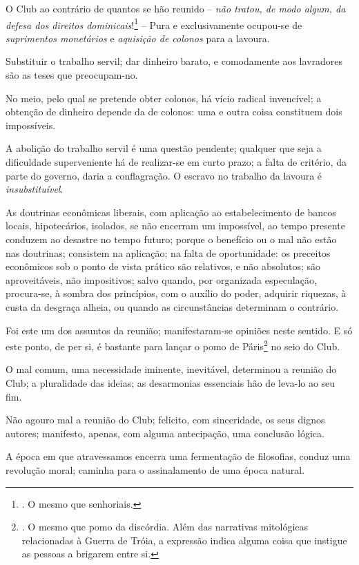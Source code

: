 O Club ao contrário de quantos se hão reunido -- \emph{não tratou, de
modo algum, da defesa dos direitos dominicais}!\footnote{. O mesmo que
  senhoriais.} -- Pura e exclusivamente ocupou-se de \emph{suprimentos
monetários} e \emph{aquisição de colonos} para a lavoura.

Substituir o trabalho servil; dar dinheiro barato, e comodamente aos
lavradores são as teses que preocupam-no.

No meio, pelo qual se pretende obter colonos, há vício radical
invencível; a obtenção de dinheiro depende da de colonos: uma e outra
coisa constituem dois impossíveis.

A abolição do trabalho servil é uma questão pendente; qualquer que seja
a dificuldade superveniente há de realizar-se em curto prazo; a falta de
critério, da parte do governo, daria a conflagração. O escravo no
trabalho da lavoura é \emph{insubstituível}.

As doutrinas econômicas liberais, com aplicação ao estabelecimento de
bancos locais, hipotecários, isolados, se não encerram um impossível, ao
tempo presente conduzem ao desastre no tempo futuro; porque o benefício
ou o mal não estão nas doutrinas; consistem na aplicação; na falta de
oportunidade: os preceitos econômicos sob o ponto de vista prático são
relativos, e não absolutos; são aproveitáveis, não impositivos; salvo
quando, por organizada especulação, procura-se, à sombra dos princípios,
com o auxílio do poder, adquirir riquezas, à custa da desgraça alheia,
ou quando as circunstâncias determinam o contrário.

Foi este um dos assuntos da reunião; manifestaram-se opiniões neste
sentido. E só este ponto, de per si, é bastante para lançar o pomo de
Páris\footnote{. O mesmo que pomo da discórdia. Além das narrativas
  mitológicas relacionadas à Guerra de Tróia, a expressão indica alguma
  coisa que instigue as pessoas a brigarem entre si.} no seio do Club.

O mal comum, uma necessidade iminente, inevitável, determinou a reunião
do Club; a pluralidade das ideias; as desarmonias essenciais hão de
leva-lo ao seu fim.

Não agouro mal a reunião do Club; felicito, com sinceridade, os seus
dignos autores; manifesto, apenas, com alguma antecipação, uma conclusão
lógica.

A época em que atravessamos encerra uma fermentação de filosofias,
conduz uma revolução moral; caminha para o assinalamento de uma época
natural.

